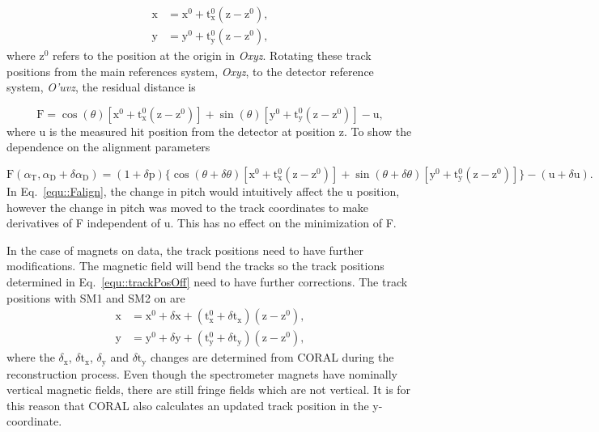 \begin{align}
  \label{equ::trackPosOff}
  \mathrm{x} &= \mathrm{x}^0 +
  \mathrm{t}_{\mathrm{x}}^0(\mathrm{z}-\mathrm{z}^0), \\
  \mathrm{y} &=
  \mathrm{y}^0 + \mathrm{t}_{\mathrm{y}}^0(\mathrm{z}-\mathrm{z}^0),
\end{align}
\noindent
where z$^0$ refers to the position at the origin in \textit{Oxyz}.
Rotating these track positions from the main references system, \textit{Oxyz},
to the detector reference system, \textit{O'uvz}, the residual distance is

\begin{equation}
\mathrm{F} = \cos(\theta)[\mathrm{x}^0 +
  \mathrm{t}_{\mathrm{x}}^0(\mathrm{z}-\mathrm{z}^0)] +
\sin(\theta)[\mathrm{y}^0 + \mathrm{t}_{\mathrm{y}}^0(\mathrm{z}-\mathrm{z}^0)]
- \mathrm{u},
\end{equation}
\noindent
where u is the measured hit position from the detector at position z.  To show
the dependence on the alignment parameters

\begin{dmath} \label{equ::Falign}
  \mathrm{F}(\alpha_{\mathrm{T}}, \alpha_{\mathrm{D}}+\delta\alpha_{\mathrm{D}})
  = (1+\delta \mathrm{p})
  \Big \{ \cos(\theta + \delta \theta)
       [\mathrm{x}^0 + \mathrm{t}^0_{\mathrm{x}}(\mathrm{z}-\mathrm{z}^0)] +
       \sin(\theta + \delta \theta)[\mathrm{y}^0 + \mathrm{t}^0_{\mathrm{y}}
         (\mathrm{z}-\mathrm{z}^0)] \Big \} -
       (\mathrm{u} + \delta \mathrm{u}).
\end{dmath}
\noindent
In Eq.~\ref{equ::Falign}, the change in pitch would intuitively affect the u
position, however the change in pitch was moved to the track coordinates to make
derivatives of F independent of u.  This has no effect on the minimization of F.

In the case of magnets on data, the track positions need to have further
modifications.  The magnetic field will bend the tracks so the track positions
determined in Eq.~\ref{equ::trackPosOff} need to have further corrections.  The
track positions with SM1 and SM2 on are
\begin{align}
  \label{equ::trackPosOn}
  \mathrm{x} &= \mathrm{x}^0 + \delta\mathrm{x} +
  (\mathrm{t}_{\mathrm{x}}^0 + \delta \mathrm{t}_{\mathrm{x}})
  (\mathrm{z}-\mathrm{z}^0), \\
  \mathrm{y} &= \mathrm{y}^0 + \delta\mathrm{y} +
  (\mathrm{t}_{\mathrm{y}}^0 + \delta \mathrm{t}_{\mathrm{y}})
  (\mathrm{z}-\mathrm{z}^0),
\end{align}
\noindent
where the $\delta_{\mathrm{x}}$, $\delta \mathrm{t}_{\mathrm{x}}$,
$\delta_{\mathrm{y}}$ and $\delta \mathrm{t}_{\mathrm{y}}$ changes are
determined from CORAL during the reconstruction process.  Even though the
spectrometer magnets have nominally vertical magnetic fields, there are still
fringe fields which are not vertical.  It is for this reason that CORAL also
calculates an updated track position in the y-coordinate.

